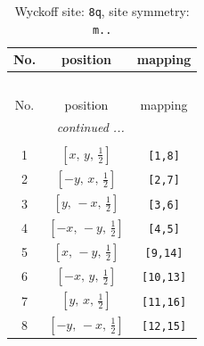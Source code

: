 \documentclass[fleqn,8pt]{jsarticle}
\begin{document}
\begin{longtable}{ccc}
\caption{Wyckoff site: {\tt 8q}, site symmetry: {\tt m..}}
 \\
 \hline \hline
No. & position & mapping \\ \hline \endfirsthead

\multicolumn{2}{l}{\tablename\ \thetable{}} \\
 \hline \hline
No. & position & mapping \\ \hline \endhead

 \hline \hline
\multicolumn{2}{r}{\footnotesize\it continued ...} \\ \endfoot

 \hline \hline
\multicolumn{2}{r}{} \\ \endlastfoot

1 & $\left[ x,\, y,\, \frac{1}{2} \right]$ & {\tt [1,8]} \\ \hline
2 & $\left[ - y,\, x,\, \frac{1}{2} \right]$ & {\tt [2,7]} \\ \hline
3 & $\left[ y,\, - x,\, \frac{1}{2} \right]$ & {\tt [3,6]} \\ \hline
4 & $\left[ - x,\, - y,\, \frac{1}{2} \right]$ & {\tt [4,5]} \\ \hline
5 & $\left[ x,\, - y,\, \frac{1}{2} \right]$ & {\tt [9,14]} \\ \hline
6 & $\left[ - x,\, y,\, \frac{1}{2} \right]$ & {\tt [10,13]} \\ \hline
7 & $\left[ y,\, x,\, \frac{1}{2} \right]$ & {\tt [11,16]} \\ \hline
8 & $\left[ - y,\, - x,\, \frac{1}{2} \right]$ & {\tt [12,15]} \\
\end{longtable}
\renewcommand{\arraystretch}{1.2}
\end{document}
